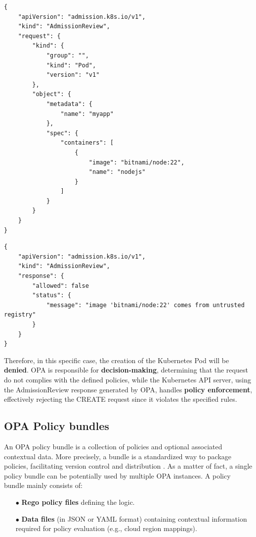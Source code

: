 \newpage
\lstset{style=jsonstyle}
\begin{lstlisting}[caption={AdmissionReview request}]
{
    "apiVersion": "admission.k8s.io/v1",
    "kind": "AdmissionReview",
    "request": {
        "kind": {
            "group": "",
            "kind": "Pod",
            "version": "v1"
        },
        "object": {
            "metadata": {
                "name": "myapp"
            },
            "spec": {
                "containers": [
                    {
                        "image": "bitnami/node:22",
                        "name": "nodejs"
                    }
                ]
            }
        }
    }
}
\end{lstlisting}

\lstset{style=jsonstyle}
\begin{lstlisting}[caption={AdmissionReview response}]
{
    "apiVersion": "admission.k8s.io/v1",
    "kind": "AdmissionReview",
    "response": {
        "allowed": false
        "status": {
            "message": "image 'bitnami/node:22' comes from untrusted registry"
        }
    }
}
\end{lstlisting}

Therefore, in this specific case, the creation of the Kubernetes Pod will be \textbf{denied}. OPA is responsible for \textbf{decision-making}, determining that the request do not complies with the defined policies, while the Kubernetes API server, using the AdmissionReview response generated by OPA, handles \textbf{policy enforcement}, effectively rejecting the CREATE request since it violates the specified rules.

\subsection{OPA Policy bundles}

An OPA policy bundle is a collection of policies and optional associated contextual data. More precisely, a bundle is a standardized way to package policies, facilitating version control and distribution \cite{opa_bundles}. As a matter of fact, a single policy bundle can be potentially used by multiple OPA instances.
A policy bundle mainly consists of:
\begin{itemize}[itemsep=0.2pt, topsep=1pt]
  \item[$\bullet$] \textbf{Rego policy files} defining the logic.
  \item[$\bullet$] \textbf{Data files} (in JSON or YAML format) containing contextual information required for policy evaluation (e.g., cloud region mappings).
\end{itemize} 

